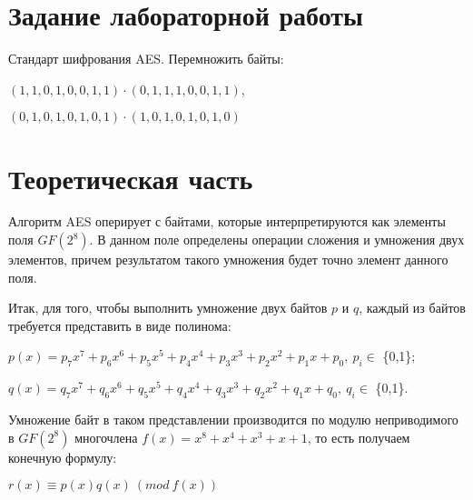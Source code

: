 \documentclass[bachelor, och, labwork]{shiza}
\begin{document}
\title{}





\author{Никитина Арсения Владимировича}




\date{2022}

\maketitle



\tableofcontents


\section{Задание лабораторной работы}
Стандарт шифрования AES. Перемножить байты:
\begin{center}
    $(1,1,0,1,0,0,1,1) \cdot (0,1,1,1,0,0,1,1)$,

    $(0,1,0,1,0,1,0,1) \cdot (1,0,1,0,1,0,1,0)$
\end{center}


\section{Теоретическая часть}

Алгоритм AES оперирует с байтами, которые интерпретируются как элементы 
поля $GF(2^8)$. В данном поле определены операции сложения и умножения двух элементов,
причем результатом такого умножения будет точно элемент данного поля.

Итак, для того, чтобы выполнить умножение двух байтов $p$ и $q$, каждый из байтов 
требуется представить в виде полинома:

\begin{center}

$p(x) = p_7x^7+p_6x^6+p_5x^5+p_4x^4+p_3x^3+p_2x^2+p_1x+p_0, ~p_i \in$ \{0,1\};

$q(x) = q_7x^7+q_6x^6+q_5x^5+q_4x^4+q_3x^3+q_2x^2+q_1x+q_0, ~q_i \in$ \{0,1\}.
\end{center}

Умножение байт в таком представлении производится по модулю неприводимого в $GF(2^8)$
многочлена $f(x)=x^8+x^4+x^3+x+1$, то есть получаем конечную формулу:

\begin{center}
    $r(x) \equiv p(x)q(x) ~(mod ~f(x))$
\end{center}


\nopagebreak
\end{document}
